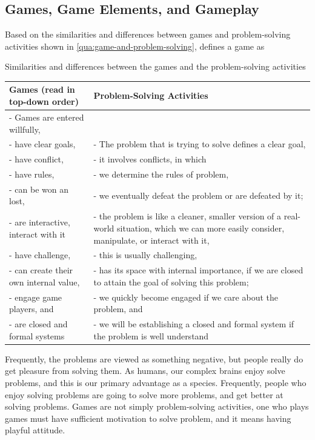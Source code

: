 \subsection{Games, Game Elements, and Gameplay}

Based on the similarities and differences between games and problem-solving activities shown in \autoref{qua:game-and-problem-solving},  defines a game as   

\begin{quadro}[htb]
\caption{Similarities and differences between the games and the problem-solving activities}
\label{qua:game-and-problem-solving}
\centering
\small
\begin{tabular}{m{5.5cm}|m{9.5cm}}
\textbf{Games} (read in top-down order) & \textbf{Problem-Solving Activities} \\ \hline \hline
- Games are entered willfully, &  \\
- have clear goals,  & - The problem that is trying to solve defines a clear goal, \\
- have conflict, & - it involves conflicts, in which \\
- have rules, & - we determine the rules of problem, \\
- can be won an lost, & - we eventually defeat the problem or are defeated by it; \\
- are interactive, interact with it & - the problem is like a cleaner, smaller version of a real-world situation, which we can more easily consider, manipulate, or interact with it, \\
- have challenge, & - this is usually challenging, \\
- can create their own internal value, & - has its space with internal importance, if we are closed to attain the goal of solving this problem; \\
- engage game players, and & - we quickly become engaged if we care about the problem, and \\
- are closed and formal systems & - we will be establishing a closed and formal system if the problem is well understand \\
\end{tabular}
\end{quadro}

Frequently, the problems are viewed as something negative, but people really do get pleasure from solving them. As humans, our complex brains enjoy solve problems, and this is our primary advantage as a species. Frequently, people who enjoy solving problems are going to solve more problems, and get better at solving problems. Games are not simply problem-solving activities, one who plays games must have sufficient motivation to solve problem, and it means having playful attitude.


